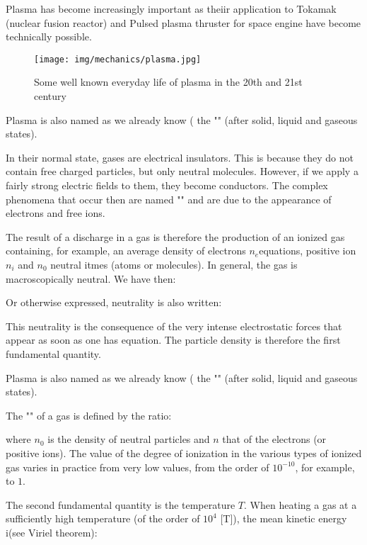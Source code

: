 	Plasma has become increasingly important as theiir application to Tokamak (nuclear fusion reactor) and Pulsed plasma thruster for space engine have become technically possible.
	\begin{figure}[H]
		\centering
		\texttt{[image: img/mechanics/plasma.jpg]}
		\caption{Some well known everyday life of plasma in the 20th and 21st century}
	\end{figure}
	\begin{tcolorbox}[title=Remark,colframe=black,arc=10pt]
	Plasma is also named as we already know ( the "" (after solid, liquid and gaseous states).
	\end{tcolorbox}
	In their normal state, gases are electrical insulators. This is because they do not contain free charged particles, but only neutral molecules. However, if we apply a fairly strong electric fields to them, they become conductors. The complex phenomena that occur then are named "" and are due to the appearance of electrons and free ions.

	The result of a discharge in a gas is therefore the production of an ionized gas containing, for example, an average density of electrons $n_e$equations, positive ion $n_i$ and $n_0$ neutral itmes (atoms or molecules). In general, the gas is macroscopically neutral. We have then:
	
	Or otherwise expressed, neutrality is also written:
	
	This neutrality is the consequence of the very intense electrostatic forces that appear as soon as one has equation. The particle density is therefore the first fundamental quantity.
	\begin{tcolorbox}[title=Remark,colframe=black,arc=10pt]
	Plasma is also named as we already know ( the "" (after solid, liquid and gaseous states).
	\end{tcolorbox}
	The "" of a gas is defined by the ratio:
	
	where $n_0$ is the density of neutral particles and $n$ that of the electrons (or positive ions). The value of the degree of ionization in the various types of ionized gas varies in practice from very low values, from the order of $10^{-10}$, for example, to $1$.

	The second fundamental quantity is the temperature $T$. When heating a gas at a sufficiently high temperature (of the order of $10^4$ [T]), the mean kinetic energy i(see Viriel theorem):
	
